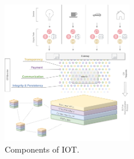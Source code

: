 \documentclass[conference]{IEEEtran}
\begin{document}
\begin{figure}[htbp]
\centerline{\includegraphics[width=0.5\textwidth]{Overview-IOT.png}}
\caption{Components of IOT.}
\label{fig:overview-iot}
\end{figure}
\end{document}
